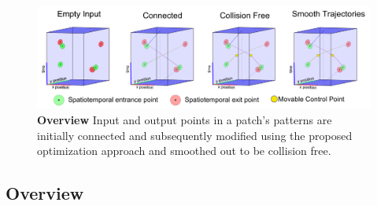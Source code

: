 \begin{figure}[ht]
	\begin{center}
	\includegraphics[width=0.9\linewidth]{./images/overview-hd.png}
	\caption{
		\textbf{Overview} Input and output points in a patch's patterns are initially connected and subsequently modified using the proposed optimization approach and smoothed out to be collision free.
	}
	\label{fig:overview}
	\end{center}
\end{figure}

\subsection{Overview}
\label{sec:method:overview}

